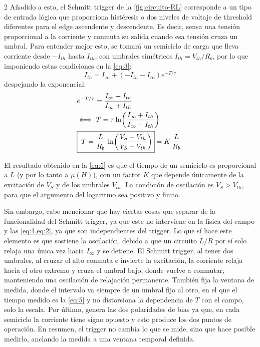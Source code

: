 \documentclass[11pt,letterpaper]{article}
\begin{document}
\begin{multicols*}{2}
Añadido a esto, el Schmitt trigger de la \cref{fig:circuito-RL} corresponde a un tipo de entrada lógica que proporciona histéresis o dos niveles de voltaje de threshold diferentes para el edge ascendente y descendente. Es decir, sensa una tensión proporcional a la corriente y conmuta su salida cuando esa tensión cruza un umbral. Para entender mejor esto, se tomará un semiciclo de carga que lleva corriente desde $-I_{th}$ hasta $I_{th}$, con umbrales simétricos $I_{th} = V_{th}/R_b$, por lo que imponiendo estas condiciones en la \cref{eq:3}:
\begin{equation*}
    I_{th} = I_{\infty} + (-I_{th}-I_{\infty})e^{-T/\tau}
\end{equation*}
despejando la exponencial:
\begin{align}
    &e^{-T/\tau}
        = \dfrac{I_{\infty} - I_{th}}{I_{\infty} + I_{th}} \notag \\
    &\Longleftrightarrow\ T
        = \tau \ln\!\left(\dfrac{I_{\infty} + I_{th}}{I_{\infty} - I_{th}}\right) \notag \\
    &\boxed{\;T = \dfrac{L}{R_b}\,
        \ln\!\left(\dfrac{V_S + V_{th}}{V_S - V_{th}}\right)
        }= K\,\dfrac{L}{R_b}\;
    \label{eq:5}
\end{align}

El resultado obtenido en la \cref{eq:5} es que el tiempo de un semiciclo es proporcional a $L$ (y por lo tanto a $\mu(H)$), con un factor $K$ que depende únicamente de la excitación de $V_S$ y de los umbrales $V_{th}$. La condición de oscilación es $V_S > V_{th}$, para que el argumento del logaritmo sea positivo y finito.

Sin embargo, cabe mencionar que hay ciertas cosas que separar de la funcionalidad del Schmitt trigger, ya que este no interviene en la física del campo y las \cref{eq:1,eq:2}, ya que son independientes del trigger. Lo que sí hace este elemento es que sostiene la oscilación, debido a que un circuito $L/R$ por sí solo relaja una única vez hacia $I_{\infty}$ y se detiene. El Schmitt trigger, al tener dos umbrales, al cruzar el alto conmuta e invierte la excitación, la corriente relaja hacia el otro extremo y cruza el umbral bajo, donde vuelve a conmutar, manteniendo una oscilación de relajación permanente. También fija la ventana de medida, donde el intervalo va siempre de un umbral fijo al otro, en el que el tiempo medido es la \cref{eq:5} y no distorsiona la dependencia de $T$ con el campo, solo la escala. Por último, genera las dos polaridades de bias ya que, en cada semiciclo la corriente tiene signo opuesto y esto produce los dos puntos de operación. En resumen, el trigger no cambia lo que se mide, sino que hace posible medirlo, anclando la medida a una ventana temporal definida.


\end{multicols*}
\end{document}
